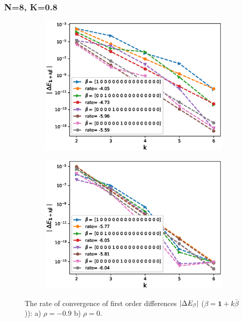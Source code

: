 \documentclass[11pt]{article}
\begin{document}
\newpage
\subsubsection*{N=8, K=0.8 }


\begin{figure}[h!]
\centering
\begin{subfigure}{.5\textwidth}
\centering
\includegraphics[width=1\linewidth]{./figures/effect_rho_differences/H_0_43_K_0_8/N_8/first_difference_rbergomi_8steps_H_043_K_0_8_rho__0_9_with_rate_W1.eps}
\caption{}
\label{fig:sub3}
\end{subfigure}%
\begin{subfigure}{.5\textwidth}
\centering
\includegraphics[width=1\linewidth]{./figures/effect_rho_differences/H_0_43_K_0_8/N_8/first_difference_rbergomi_8steps_H_043_K_0_8_rho_0_with_rate_W1.eps}
\caption{}
\label{fig:sub4}
\end{subfigure}

\caption{The rate of convergence of  first order differences $\left\lvert\Delta E_{\beta}\right\rvert$ ($\beta=\mathbf{1}+k \bar{\beta}$)): a) $\rho=-0.9$ b)  $\rho=0.$}
\label{fig:test2}
\end{figure}
\end{document}
